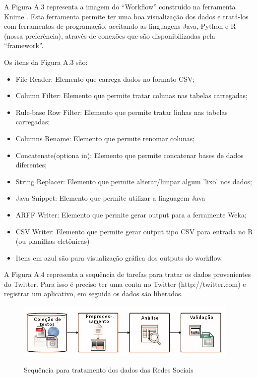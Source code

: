 A Figura A.3 representa a imagem do ``Workflow'' construído na ferramenta Knime \cite{Knime2}.
Esta ferramenta permite ter uma boa visualização dos dados e tratá-los com ferramentas de programação, aceitando as linguagens Java, Python e R (nossa preferência), através de conexões que são disponibilizadas pela ``framework''.

Os itens da Figura A.3 são:
\begin{itemize}
	\item File Reader: Elemento que carrega dados no formato CSV;
	\item Column Filter: Elemento que permite tratar colunas nas tabelas carregadas;
	\item Rule-base Row Filter: Elemento que permite tratar linhas nas tabelas carregadas;
	\item Columns Rename: Elemento que permite renomar colunas;
	\item Concatenate(optiona in): Elemento que permite concatenar bases de dados diferentes;
	\item String Replacer: Elemento que permite alterar/limpar algum 'lixo' nos dados;
	\item Java Snippet: Elemento que permite utilizar a linguagem Java
	\item ARFF Writer: Elemento que permite gerar output para a ferramente Weka;
	\item CSV Writer:  Elemento que permite gerar output tipo CSV para entrada no R (ou planilhas eletônicas)
	\item Itens em azul são para visualização gráfica dos outputs do workflow
\end{itemize}



\pagebreak



A Figura A.4 representa a sequência de tarefas para tratar os dados provenientes do Twitter. Para isso é preciso ter uma conta no Twitter (http://twitter.com) e registrar  um aplicativo, em seguida os dados são liberados.
\begin{figure}[ht!]
	\centering
\caption{Sequência para tratamento dos dados das Redes Sociais}
	\includegraphics[width=0.7\linewidth]{Figuras/Twitter/prepocesTextos}
	\label{fig:workflow Twitter}
\end{figure}

